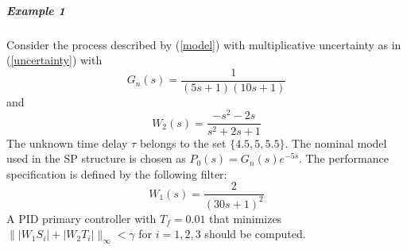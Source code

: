 \documentclass[default]{svmult}
\begin{document}
\subparagraph{Example 1}
Consider the process described by (\ref{model}) with multiplicative uncertainty as in (\ref{uncertainty}) with 
\begin{equation}
G_n(s)=\frac{1}{(5s+1)(10s+1)}
\end{equation}
and 
\begin{equation}
 W_2(s)=\frac{ -s^2 - 2 s}{s^2 + 2 s + 1}
\end{equation}
The unknown time delay $\tau$  belongs to the set $\{4.5, 5, 5.5\}$.
The nominal model used in the SP structure is chosen as $P_0(s)=G_n(s)e^{-5s}$.
The performance specification is defined by the following filter:
 \begin{equation}
 W_1(s)=\frac{2}{(30s+1)^2}
\end{equation}
A PID primary controller with $T_f=0.01$ that minimizes $\| |W_1S_i|+|W_2T_i|  \|_{\infty}<\gamma$ for $i=1,2,3$ should be computed.
\end{document}
